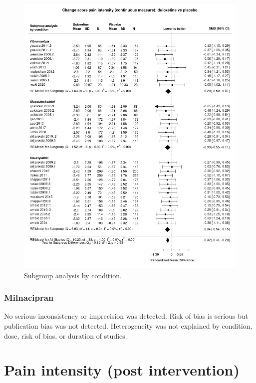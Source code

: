 \documentclass{report}\usepackage[]{graphicx}\usepackage[]{color}
\begin{document}
\begin{figure}
\includegraphics[width=\textwidth]{img/pain_int-change_score-condition-duloxetine-placebo-forest.png}
\caption[Pain intensity by condition: duloxetine]{
Subgroup analysis by condition.
% 
}
\label{fig:pain_int-cs-condition-milna-plac}
\end{figure}


\subsubsection{Milnacipran}

No serious inconsistency or imprecision was detected. Risk of bias is serious but publication bias was not detected. Heterogeneity was not explained by condition, dose, risk of bias, or duration of studies.




\section{Pain intensity (post intervention)}
\end{document}
